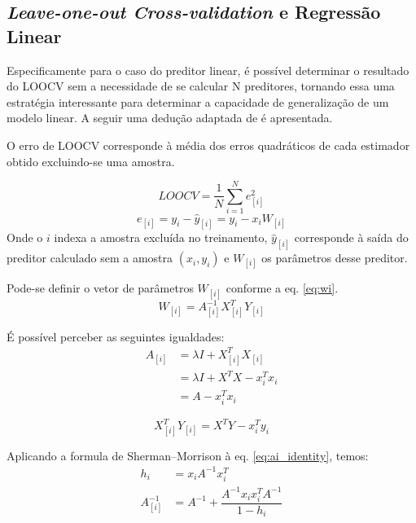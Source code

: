 \subsection{ \textit{Leave-one-out Cross-validation} e Regressão Linear}

Especificamente para o caso do preditor linear, é possível determinar o resultado do LOOCV sem a necessidade de se calcular N preditores, tornando essa uma estratégia interessante para determinar a capacidade de generalização de um modelo linear. A seguir uma dedução adaptada de \cite[p. 268]{lin_reg_analysis} é apresentada.

O erro de LOOCV corresponde à média dos erros quadráticos de cada estimador obtido excluindo-se uma amostra. 

\begin{equation}
    LOOCV = \dfrac{1}{N} \sum_{i=1}^{N}e^2_{[i]}
    \label{eq:cv_error}
\end{equation}
\begin{equation}
    e_{[i]} = y_i - \hat{y}_{[i]} = y_i - x_iW_{[i]} 
    \label{eq:ith_error}
\end{equation}
Onde o $i$ indexa a amostra excluída no treinamento, $\hat{y}_{[i]}$ corresponde à saída do preditor calculado sem a
amostra $(x_i,y_i)$ e $W_{[i]}$ os parâmetros desse preditor.

Pode-se definir o vetor de parâmetros $W_{[i]}$ conforme a eq. \ref{eq:wi}.
\begin{equation}
    W_{[i]} = A_{[i]}^{-1}X_{[i]}^TY_{[i]}
    \label{eq:wi}
\end{equation} 

É possível perceber as seguintes igualdades:
\smallskip\noindent
\begin{equation}
    \begin{split}
        A_{[i]} &= \lambda I + X_{[i]}^TX_{[i]} \\
                &= \lambda I + X^TX - x_i^Tx_i \\
                &= A - x_i^Tx_i    
    \end{split}
    \label{eq:ai_identity}
\end{equation} 

\begin{equation}
    X_{[i]}^TY_{[i]} = X^TY - x_i^Ty_i
    \label{eq:X_iY_i_identity}
\end{equation} 

Aplicando a formula de Sherman–Morrison à eq. \ref{eq:ai_identity}, temos:
\smallskip\noindent
\begin{equation}
    \begin{split}        
       h_i &= x_iA^{-1}x_i^T \\
       A_{[i]}^{-1} &= A^{-1} + \dfrac{A^{-1}x_ix_i^TA^{-1}}{1-h_i}
    \end{split}
    \label{eq:sherman}
\end{equation}

